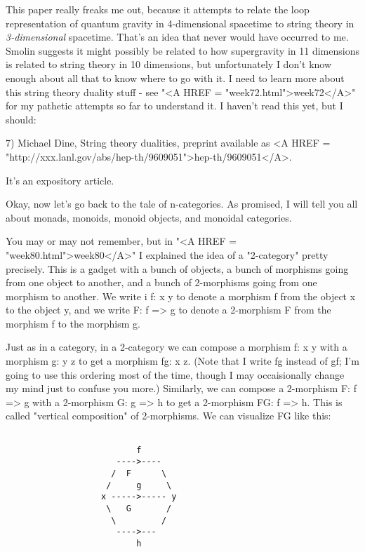 This paper really freaks me out, because it attempts to relate the loop
representation of quantum gravity in 4-dimensional spacetime to string
theory in \emph{3-dimensional} spacetime.  That's an idea that never would
have occurred to me.  Smolin suggests it might possibly be related
to how supergravity in 11 dimensions is related to string theory in 10
dimensions, but unfortunately I don't know enough about all that to know
where to go with it.  I need to learn more about this string theory
duality stuff - see "<A HREF = "week72.html">week72</A>" for my pathetic attempts so far to
understand it.  I haven't read this yet, but I should:

7) Michael Dine, String theory dualities, preprint available as
<A HREF = "http://xxx.lanl.gov/abs/hep-th/9609051">hep-th/9609051</A>.  

It's an expository article.

Okay, now let's go back to the tale of n-categories.  As promised, I
will tell you all about monads, monoids, monoid objects, and monoidal
categories. 

You may or may not remember, but in "<A HREF = "week80.html">week80</A>" I explained the idea of a
"2-category" pretty precisely.  This is a gadget with a bunch of
objects, a bunch of morphisms going from one object to another, and a
bunch of 2-morphisms going from one morphism to another.  We write i
f: x \to  y to denote a morphism f from the object x to the object y, and we
write F: f => g to denote a 2-morphism F from the morphism f to the
morphism g.  

Just as in a category, in a 2-category we can compose a morphism f: x \to  y 
with a morphism g: y \to  z to get a morphism fg: x \to  z.  (Note that I
write fg instead of gf; I'm going to use this ordering most of the time,
though I may occaisionally change my mind just to confuse you more.) 
Similarly, we can compose a 2-morphism F: f => g with a 2-morphism G: g
=> h to get a 2-morphism FG: f => h.  This is called "vertical
composition" of 2-morphisms.   We can visualize FG like this:


\begin{verbatim}

                          f    
                      ---->----
                     /  F      \
                    /     g     \
                   x ----->----- y
                    \   G       /
                     \         /
                      ---->---
                          h

\end{verbatim}
    
